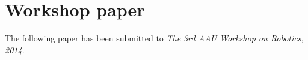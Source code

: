 \chapter{Workshop paper}
\label{ch:paper}

The following paper has been submitted to \textit{The 3rd AAU
Workshop on Robotics, 2014}.




